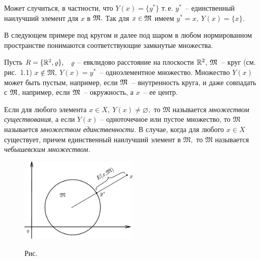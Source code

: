 Может случиться, в частности, что {$Y(x)=\{y^*\}$} т.\,е. $y^*$~-- единственный
наилучший элемент для $x$ в $\mathfrak{M}.$ Так для $x \in \mathfrak{M}$ имеем $y^*=x,\ Y(x)=\{x\}.$

В следующем примере под кругом и далее под шаром в
любом нормированном пространстве понимаются соответствующие
замкнутые множества.

\begin{Example}
{Пусть $R=\{\mathbb{R}^2, \varrho\},$~ $\varrho$ -- евклидово расстояние на плоскости
$\mathbb{R}^2$,} $\mathfrak{M}$~-- круг {{(см. рис.~1.1)}} $x\notin \mathfrak{M},\
Y(x)=y^*$~-- одноэлементное множество. {Множество $Y(x)$} может быть пустым, например, если $\mathfrak{M}$~-- внутренность круга, {и даже совпадать с $\mathfrak{M}$, например, если
$\mathfrak{M}$~-- окружность}, а ${x}$~-- ее центр.
\end{Example}

\begin{defi}
Если для любого элемента $x\in X,\ Y(x)\ne \varnothing,$ то
$\mathfrak{M}$ называется {\it множеством существования}, а
если $Y(x)$ -- одноточечное или пустое множество, то $\mathfrak{M}$
называется {\it множеством единственности.} В случае, когда
для любого $x\in X$ существует, причем единственный наилучший элемент в
$\mathfrak{M},$ то $\mathfrak{M}$ называется {\it чебышевским множеством.}
\end{defi}


\begin{figure}[ht]
\begin{center}
\includegraphics[width=0.5\textwidth]{pict01-1.eps}
\end{center}
 \bigskip
 \label{r1-1}

 \centerline{Рис.~\theris}
 \bigskip
\end{figure}


